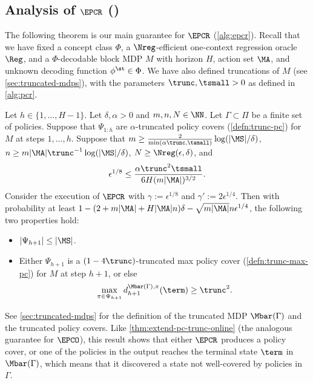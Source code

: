 \subsection{Analysis of $\EPCR$ ()}\label{sec:epcr-analysis}

The following theorem is our main guarantee for $\EPCR$ (\cref{alg:epcr}). Recall that we have fixed a concept class $\Phi$, a $\Nreg$-efficient one-context regression oracle $\Reg$, and a $\Phi$-decodable block MDP $M$ with horizon $H$, action set $\MA$, and unknown decoding function $\phi^\st \in \Phi$. We have also defined truncations of $M$ (see \cref{sec:truncated-mdps}), with the parameters $\trunc,\tsmall>0$ as defined in \cref{alg:pcr}.

\begin{theorem}\label{thm:extend-pc-trunc}
Let $h \in \{1,\dots,H-1\}$. Let $\delta,\alpha > 0$ and $m,n,N \in \NN$. Let $\Gamma \subset \Pi$ be a finite set of policies. Suppose that $\Psi_{1:h}$ are $\alpha$-truncated policy covers (\cref{defn:trunc-pc}) for $M$ at steps $1,\dots,h$. Suppose that $m \geq \frac{2}{\min(\alpha\trunc,\tsmall)}\log(|\MS|/\delta)$, $n \geq m|\MA|\trunc^{-1}\log(|\MS|/\delta)$, $N \geq \Nreg(\epsilon,\delta)$, and
\begin{equation} \epsilon^{1/8} \leq \frac{\alpha \trunc^2 \tsmall}{6H(m|\MA|)^{3/2}}.\label{eq:param-assm}
\end{equation}
Consider the execution of $\EPCR$ with $\gamma := \epsilon^{1/8}$ and $\gamma' := 2\epsilon^{1/4}$. Then with probability at least $1-(2+m|\MA|+H|\MA|n)\delta-\sqrt{m|\MA|}n\epsilon^{1/4}$, the following two properties hold:
\begin{itemize}
\item $|\Psi_{h+1}| \leq |\MS|$.
\item Either $\Psi_{h+1}$ is a $(1-4\trunc)$-truncated max policy cover (\cref{defn:trunc-max-pc}) for $M$ at step $h+1$, or else \[\max_{\pi\in\Psi_{h+1}} d^{\Mbar(\Gamma),\pi}_{h+1}(\term) \geq \trunc^2.\]
\end{itemize}
\end{theorem}

See \cref{sec:truncated-mdps} for the definition of the truncated MDP $\Mbar(\Gamma)$ and the truncated policy covers. Like \cref{thm:extend-pc-trunc-online} (the analogous guarantee for $\EPCO$), this result shows that either $\EPCR$ produces a policy cover, or one of the policies in the output reaches the terminal state $\term$ in $\Mbar(\Gamma)$, which means that it discovered a state not well-covered by policies in $\Gamma$.

